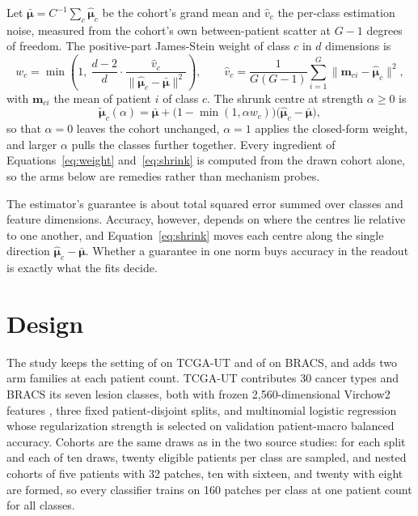 \documentclass[11pt]{article}
\begin{document}
Let $\bar{\boldsymbol\mu}=C^{-1}\sum_c\hat{\boldsymbol\mu}_c$ be the cohort's grand mean and $\hat v_c$ the per-class estimation noise, measured from the cohort's own between-patient scatter at $G-1$ degrees of freedom. The positive-part James-Stein weight of class $c$ in $d$ dimensions is
\begin{equation}
  w_c=\min\!\left(1,\ \frac{d-2}{d}\cdot\frac{\hat v_c}{\lVert\hat{\boldsymbol\mu}_c-\bar{\boldsymbol\mu}\rVert^2}\right),
  \qquad
  \hat v_c=\frac{1}{G(G-1)}\sum_{i=1}^{G}\lVert\mathbf m_{ci}-\hat{\boldsymbol\mu}_c\rVert^2,
  \label{eq:weight}
\end{equation}
\noindent with $\mathbf m_{ci}$ the mean of patient $i$ of class $c$. The shrunk centre at strength $\alpha\ge0$ is
\begin{equation}
  \tilde{\boldsymbol\mu}_c(\alpha)=\bar{\boldsymbol\mu}+\bigl(1-\min(1,\alpha w_c)\bigr)\bigl(\hat{\boldsymbol\mu}_c-\bar{\boldsymbol\mu}\bigr),
  \label{eq:shrink}
\end{equation}
\noindent so that $\alpha=0$ leaves the cohort unchanged, $\alpha=1$ applies the closed-form weight, and larger $\alpha$ pulls the classes further together. Every ingredient of Equations~\ref{eq:weight} and~\ref{eq:shrink} is computed from the drawn cohort alone, so the arms below are remedies rather than mechanism probes.

The estimator's guarantee is about total squared error summed over classes and feature dimensions. Accuracy, however, depends on where the centres lie relative to one another, and Equation~\ref{eq:shrink} moves each centre along the single direction $\hat{\boldsymbol\mu}_c-\bar{\boldsymbol\mu}$. Whether a guarantee in one norm buys accuracy in the readout is exactly what the fits decide.

\section{Design}
\label{sec:design}
The study keeps the setting of \citet{queisler2026centreError} on TCGA-UT and of \citet{queisler2026bracsMechanism} on BRACS, and adds two arm families at each patient count. TCGA-UT contributes 30 cancer types and BRACS its seven lesion classes, both with frozen 2,560-dimensional Virchow2 features \citep{zimmermann2024virchow2}, three fixed patient-disjoint splits, and multinomial logistic regression whose regularization strength is selected on validation patient-macro balanced accuracy. Cohorts are the same draws as in the two source studies: for each split and each of ten draws, twenty eligible patients per class are sampled, and nested cohorts of five patients with 32 patches, ten with sixteen, and twenty with eight are formed, so every classifier trains on 160 patches per class at one patient count for all classes.
\end{document}
